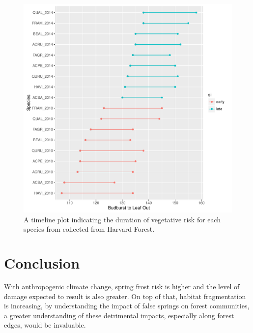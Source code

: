\documentclass{article}\usepackage[]{graphicx}\usepackage[]{color}
\makeatletter
\def\maxwidth{ %
  \ifdim\Gin@nat@width>\linewidth
    \linewidth
  \else
    \Gin@nat@width
  \fi
}
\makeatother
\begin{document}
\begin{figure}[H]
\includegraphics[width=\maxwidth]{figure/forest-1} \caption[A timeline plot indicating the duration of vegetative risk for each species from collected from Harvard Forest]{A timeline plot indicating the duration of vegetative risk for each species from collected from Harvard Forest.}\label{fig:forest}
\end{figure}



\section{Conclusion}
With anthropogenic climate change, spring frost risk is higher and the level of damage expected to result is also greater. On top of that, habitat fragmentation is increasing, by understanding the impact of false springs on forest communities, a greater understanding of these detrimental impacts, especially along forest edges, would be invaluable. 
\end{document}
